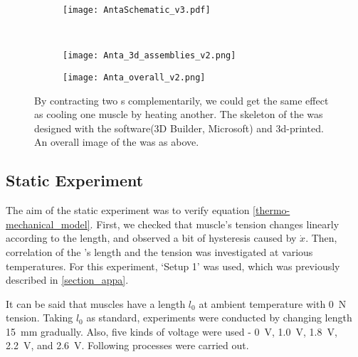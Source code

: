 
\begin{figure}[t]
	\centering
	\begin{subfigure}[t]{0.5\textwidth}
		\centering\texttt{[image: AntaSchematic\_v3.pdf]}
		\caption{\label{anta_sch}}
	\end{subfigure}
	~			
	\begin{subfigure}[t]{0.3\textwidth}
		\centering\texttt{[image: Anta\_3d\_assemblies\_v2.png]}
		\caption{\label{3d_assemblies}}
	\end{subfigure}
	
	\begin{subfigure}[t]{0.81\textwidth}
		\centering\texttt{[image: Anta\_overall\_v2.png]}
		\caption{\label{anta_overall}}
	\end{subfigure}
	
	\caption[\Anta]{ By contracting two \scpnospace s complementarily, we could get the same effect as cooling one muscle by heating another.  The skeleton of the \anta was designed with the software(3D Builder, Microsoft) and 3d-printed.  An overall image of the \anta was as above.}
	\label{anta_design}
\end{figure}

\subsection{Static Experiment} \label{subsection_static_experiment}
The aim of the static experiment was to verify equation \eqref{thermo-mechanical_model}.
First, we checked that muscle's tension changes linearly according to the length, and observed a bit of hysteresis caused by $\dot{x}$.
Then, correlation of the \scpnospace's length and the tension was investigated at various temperatures. 
For this experiment, `Setup 1' was used, which was previously described in \ref{section_appa}.

It can be said that muscles have a length $l_{0}$ at ambient temperature with \SI{0}{\newton} tension. Taking $l_{0}$ as standard, experiments were conducted by changing length \SI{15}{\milli\meter} gradually. Also, five kinds of voltage were used - \SI{0}{\volt}, \SI{1.0}{\volt}, \SI{1.8}{\volt}, \SI{2.2}{\volt}, and \SI{2.6}{\volt}. 
Following processes were carried out.

